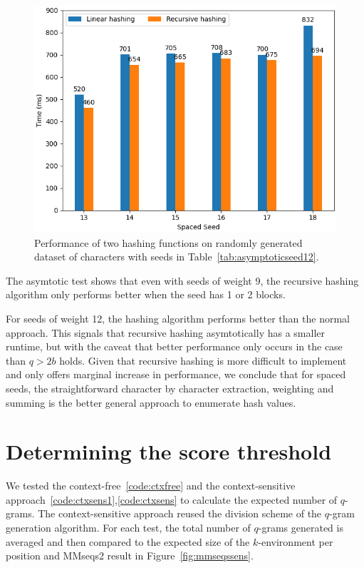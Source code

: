 \documentclass[twoside,a4paper,bsc]{master}
\newcommand{\Qgram}[1]{\(#1\)-gram}
\begin{document}
\begin{figure}[t]
\begin{center}
\includegraphics[scale=0.45]{graphics/asymtotic12.png}
\end{center}
\caption{Performance of two hashing functions on randomly generated dataset of
 characters with seeds in Table~\ref{tab:asymptoticseed12}.}
\label{fig:asymptoticseed12}
\end{figure}

The asymtotic test shows that even with seeds of weight 9, the recursive hashing
algorithm only performs better when the seed has 1 or 2 blocks.

For seeds of weight 12, the hashing algorithm performs better than the normal
approach. This signals that recursive hashing asymtotically has a smaller
runtime, but with the caveat that better performance only occurs in the case
than \(q > 2b\) holds. Given that recursive hashing is more difficult to
implement and only offers marginal increase in performance, we conclude
that for spaced seeds, the straightforward character by character extraction,
weighting and summing is the better general approach to enumerate hash values.

\section{Determining the score threshold}
We tested the context-free~\ref{code:ctxfree} and the context-sensitive 
approach~\ref{code:ctxsens1},\ref{code:ctxsens} to calculate
the expected number of \(q\)-grams. The context-sensitive approach
reused the division scheme of the \Qgram{q}
generation algorithm. For each test, the total number of \Qgram{q}s
generated is averaged and then compared to the expected size of the
\(k\)-environment per position and MMseqs2 result in Figure~\ref{fig:mmseqssens}.
\end{document}
